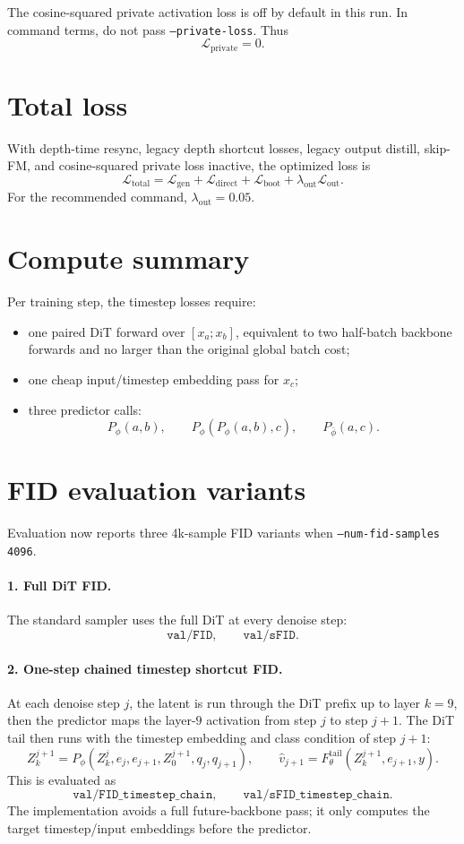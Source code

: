 \documentclass[11pt]{article}
\begin{document}
The cosine-squared private activation loss is off by default in this run. In
command terms, do not pass \texttt{--private-loss}. Thus
\[
  \mathcal{L}_{\mathrm{private}}=0.
\]

\section{Total loss}

With depth-time resync, legacy depth shortcut losses, legacy output distill,
skip-FM, and cosine-squared private loss inactive, the optimized loss is
\[
\boxed{
  \mathcal{L}_{\mathrm{total}}
  =
  \mathcal{L}_{\mathrm{gen}}
  +
  \mathcal{L}_{\mathrm{direct}}
  +
  \mathcal{L}_{\mathrm{boot}}
  +
  \lambda_{\mathrm{out}}\mathcal{L}_{\mathrm{out}}.
}
\]
For the recommended command, $\lambda_{\mathrm{out}}=0.05$.

\section{Compute summary}

Per training step, the timestep losses require:
\begin{itemize}
\item one paired DiT forward over $[x_a;x_b]$, equivalent to two half-batch
  backbone forwards and no larger than the original global batch cost;
\item one cheap input/timestep embedding pass for $x_c$;
\item three predictor calls:
  \[
    P_\phi(a,b),\qquad P_\phi(P_\phi(a,b),c),\qquad P_{\bar\phi}(a,c).
  \]
\end{itemize}

\section{FID evaluation variants}

Evaluation now reports three 4k-sample FID variants when
\texttt{--num-fid-samples 4096}.

\paragraph{1. Full DiT FID.}
The standard sampler uses the full DiT at every denoise step:
\[
  \texttt{val/FID},\qquad \texttt{val/sFID}.
\]

\paragraph{2. One-step chained timestep shortcut FID.}
At each denoise step $j$, the latent is run through the DiT prefix up to layer
$k=9$, then the predictor maps the layer-$9$ activation from step $j$ to
step $j+1$. The DiT tail then runs with the timestep embedding and class
condition of step $j+1$:
\[
  Z_k^{j+1}=P_\phi(Z_k^j,e_j,e_{j+1},Z_0^{j+1},q_j,q_{j+1}),
  \qquad
  \hat v_{j+1}=F_\theta^{\mathrm{tail}}(Z_k^{j+1},e_{j+1},y).
\]
This is evaluated as
\[
  \texttt{val/FID\_timestep\_chain},\qquad
  \texttt{val/sFID\_timestep\_chain}.
\]
The implementation avoids a full future-backbone pass; it only computes the
target timestep/input embeddings before the predictor.
\end{document}
